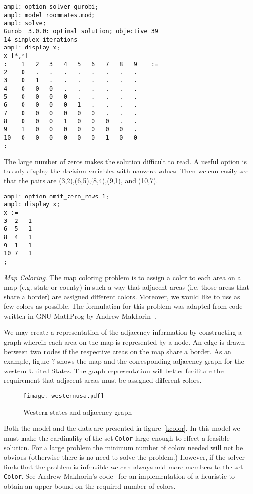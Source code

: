 \begin{Verbatim}[samepage=true]
ampl: option solver gurobi;
ampl: model roommates.mod;
ampl: solve;
Gurobi 3.0.0: optimal solution; objective 39
14 simplex iterations
ampl: display x;
x [*,*]
:    1   2   3   4   5   6   7   8   9    :=
2    0   .   .   .   .   .   .   .   .
3    0   1   .   .   .   .   .   .   .
4    0   0   0   .   .   .   .   .   .
5    0   0   0   0   .   .   .   .   .
6    0   0   0   0   1   .   .   .   .
7    0   0   0   0   0   0   .   .   .
8    0   0   0   1   0   0   0   .   .
9    1   0   0   0   0   0   0   0   .
10   0   0   0   0   0   0   1   0   0
;
\end{Verbatim}

The large number of zeros makes the solution difficult to read. A useful
option is to only display the decision variables with nonzero values. Then
we can easily see that the pairs are (3,2),(6,5),(8,4),(9,1), and (10,7).

\begin{Verbatim}[samepage=true]
ampl: option omit_zero_rows 1;
ampl: display x;
x :=
3  2   1
6  5   1
8  4   1
9  1   1
10 7   1
;
\end{Verbatim}

\emph{Map Coloring.}
The map coloring problem is to assign a color to each area on a map
(e.g. state or county) in such a way that adjacent areas (i.e. those
areas that share a border) are assigned different colors. Moreover, we 
would like to use as few colors as possible. The formulation for this
problem was adapted from code written in GNU MathProg by Andrew
Makhorin~\cite{glpk}.

We may create a representation of the adjacency information by constructing a
graph wherein each area on the map is represented by a node. An 
edge is drawn between two nodes if the respective areas on the map share a border.
As an example, figure ? shows the map and the corresponding
adjacency graph for the western United States. The graph representation
will better facilitate the requirement that adjacent areas must be assigned 
different colors.

\begin{figure}
\begin{center}
\texttt{[image: westernusa.pdf]}
\caption{Western states and adjacency graph}
\label{westernusa}
\end{center}
\end{figure}

Both the model and the data are presented in figure~\ref{kcolor}. In this model
we must make the cardinality of the set \texttt{Color} large enough to effect
a feasible solution. For a large problem the minimum number of colors needed will not
be obvious (otherwise there is no need to solve the problem.) However, if the 
solver finds that the problem is infeasible we can always add more members to the
set \texttt{Color}. See Andrew Makhorin's code~\cite{glpk} for an implementation
of a heuristic to obtain an upper bound on the required number of colors.

